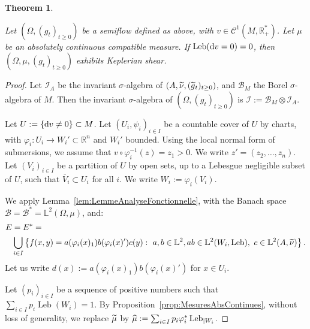 \documentclass[10pt]{amsart}
\newtheorem{theo}{Theorem}[section]
\theoremstyle{definition}\newtheorem{defi}[theo]{Definition}\newtheorem{rema}[theo]{Remark}\newtheorem{exam}[theo]{Example}\newtheorem{exem}[theo]{Example}\newtheorem{nota}[theo]{Notation}
\DeclareMathOperator{\Leb}{Leb}
\newcommand{\R}{\mathbb{R}}
\newcommand{\Lbb}{\mathbb{L}}
\newcommand{\Bcal}{\mathcal{B}}
\newcommand{\Ccal}{\mathcal{C}}
\newcommand{\Ical}{\mathcal{I}}
\newcommand{\de}{{\rm d}}
\let\oldtilde\tilde
\renewcommand*{\tilde}[1]{\mathchoice{\widetilde{#1}}{\widetilde{#1}}{\oldtilde{#1}}{\oldtilde{#1}}}\let\oldhat\hat
\renewcommand*{\hat}[1]{\mathchoice{\widehat{#1}}{\widehat{#1}}{\oldhat{#1}}{\oldhat{#1}}}\let\oldforall\forall
\renewcommand*{\forall}{\mathrel{\oldforall}}
\begin{document}
\begin{theo}\label{thm:CisaillementSuspensions}

Let $(\Omega, (g_t)_{t \geq 0})$ be a semiflow defined as above, with $v \in \Ccal^1 (M, \R_+^*)$. Let $\mu$ be an absolutely continuous compatible measure. If $\Leb (\de v=0)\linebreak=0$, then $(\Omega, \mu, (g_t)_{t \geq 0})$ exhibits Keplerian shear.
\end{theo}




\begin{proof}
Let $\Ical_A$ be the invariant $\sigma$-algebra of $(A, \tilde{\nu}, (\tilde{g}_t)_{t \geq 0})$, and $\Bcal_M$ the Borel $\sigma$-algebra of $M$. Then the invariant $\sigma$-algebra of $(\Omega, (g_t)_{t \geq 0})$ is $\Ical := \Bcal_M \otimes \Ical_A$.


Let $U := \{\de v \neq 0\} \subset M$. Let $(U_i, \psi_i)_{i \in I}$ be a countable cover of $U$ by charts, with $\varphi_i : U_i \to W_i' \subset \R^n$ and $W_i'$ bounded. Using the local normal form of submersions, we assume that $v \circ \varphi_i^{-1} (z) = z_1>0$. We write $z' = (z_2, \ldots, z_n)$. Let $(V_i)_{i \in I}$ be a partition of $U$ by open sets, up to a Lebesgue negligible subset of $U$, such that $\overline{V}_i \subset U_i$ for all $i$. We write $W_i := \varphi_i (V_i)$.


We apply Lemma~\ref{lem:LemmeAnalyseFonctionnelle}, with the Banach space $\Bcal = \Bcal^* = \Lbb^2 (\Omega, \mu)$, and:
\begin{align*}
E & = E^* = \\
& \bigcup_{i \in I} \left\{f(x,y)=a (\varphi_i (x)_1) b (\varphi_i (x)') c(y) : \ a, b \in \Lbb^2, ab \in \Lbb^2 (W_i, \Leb), \ c \in \Lbb^2 (A, \tilde{\nu}) \right\}.
\end{align*}
Let us write $d(x):= a(\varphi_i (x)_1) b(\varphi_i (x)')$ for $x \in U_i$.


Let $(p_i)_{i \in I}$ be a sequence of positive numbers such that $\sum_{i \in I} p_i \Leb (W_i) = 1$. By Proposition~\ref{prop:MesuresAbsContinues}, without loss of generality, we replace $\tilde{\mu}$ by $\hat{\mu} := \sum_{i \in I} p_i \varphi_i^* \Leb_{|W_i}$.



\end{proof}
\end{document}
